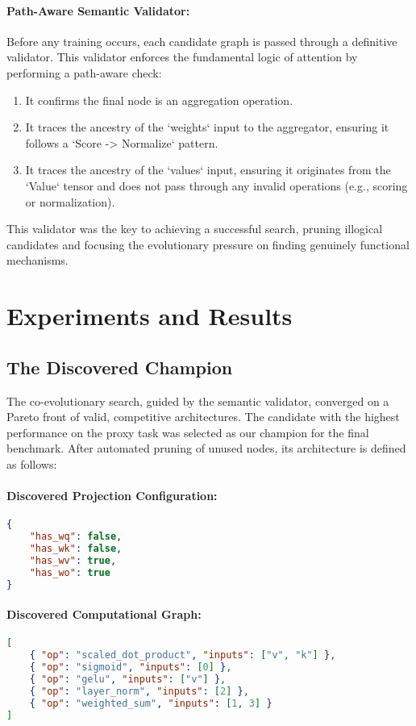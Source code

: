 \documentclass[11pt, a4paper]{article}
\begin{document}
\paragraph{Path-Aware Semantic Validator:} Before any training occurs, each candidate graph is passed through a definitive validator. This validator enforces the fundamental logic of attention by performing a path-aware check:
\begin{enumerate}
    \item It confirms the final node is an aggregation operation.
    \item It traces the ancestry of the `weights` input to the aggregator, ensuring it follows a `Score -> Normalize` pattern.
    \item It traces the ancestry of the `values` input, ensuring it originates from the `Value` tensor and does not pass through any invalid operations (e.g., scoring or normalization).
\end{enumerate}
This validator was the key to achieving a successful search, pruning illogical candidates and focusing the evolutionary pressure on finding genuinely functional mechanisms.

\section{Experiments and Results}

\subsection{The Discovered Champion}
The co-evolutionary search, guided by the semantic validator, converged on a Pareto front of valid, competitive architectures. The candidate with the highest performance on the proxy task was selected as our champion for the final benchmark. After automated pruning of unused nodes, its architecture is defined as follows:

\paragraph{Discovered Projection Configuration:}
\begin{lstlisting}[language=json, title={Optimal Projection Strategy}]
{
    "has_wq": false,
    "has_wk": false,
    "has_wv": true,
    "has_wo": true
}
\end{lstlisting}

\paragraph{Discovered Computational Graph:}
\begin{lstlisting}[language=json, title={Pruned Attention Graph}]
[
    { "op": "scaled_dot_product", "inputs": ["v", "k"] },
    { "op": "sigmoid", "inputs": [0] },
    { "op": "gelu", "inputs": ["v"] },
    { "op": "layer_norm", "inputs": [2] },
    { "op": "weighted_sum", "inputs": [1, 3] }
]
\end{lstlisting}
\end{document}
